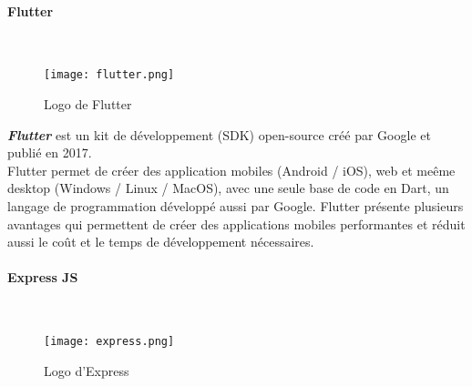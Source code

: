 \paragraph{Flutter}\mbox{} \\
\vspace{1cm}
\begin{figure}[H]
    \centering
    \texttt{[image: flutter.png]}
    \vspace{1cm}
    \caption{Logo de Flutter}
    \label{fig:flutter_logo}
\end{figure}
\textit{\textbf{Flutter}} est un kit de développement (SDK) open-source créé par Google et publié en 2017.\\
\noindent Flutter permet de créer des application mobiles (Android / iOS), web et meême desktop (Windows / Linux / MacOS), avec une seule base de code en Dart, un langage de programmation développé aussi par Google.
Flutter présente plusieurs avantages qui permettent de créer des applications mobiles performantes et réduit aussi le coût et le temps de développement nécessaires.
\paragraph{Express JS}\mbox{} \\
\vspace{1cm}
\begin{figure}[H]
    \centering
    \texttt{[image: express.png]}
    \vspace{1cm}
    \caption{Logo d'Express}
    \label{fig:express_logo}
\end{figure}